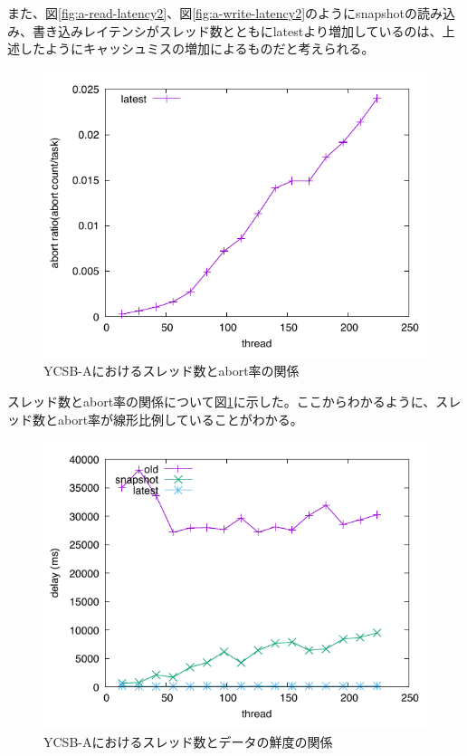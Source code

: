 \documentclass[a4paper]{jreport}	%
\begin{document}
また、図\ref{fig:a-read-latency2}、図\ref{fig:a-write-latency2}のようにsnapshotの読み込み、書き込みレイテンシがスレッド数とともにlatestより増加しているのは、上述したようにキャッシュミスの増加によるものだと考えられる。

\begin{figure}[h] 
\centering
\includegraphics[width=15cm]{ycsb-a/opposite-abort}
\caption{YCSB-Aにおけるスレッド数とabort率の関係}
\label{fig:a-abort}
\end{figure}

スレッド数とabort率の関係について図\ref{fig:a-abort}に示した。ここからわかるように、スレッド数とabort率が線形比例していることがわかる。


\begin{figure}[h] 
\centering
\includegraphics[width=15cm]{ycsb-a/opposite-delay}
\caption{YCSB-Aにおけるスレッド数とデータの鮮度の関係}
\label{fig:a-delay}
\end{figure}
\end{document}
